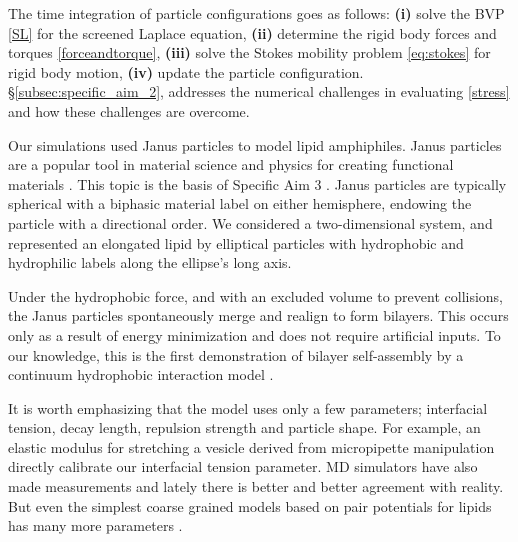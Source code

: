 The time integration of particle configurations goes as follows: 
\textbf{(i)} solve the BVP \eqref{SL} for the screened Laplace equation, 
\textbf{(ii)} determine the rigid body forces and torques \eqref{forceandtorque}, 
\textbf{(iii)} solve the Stokes mobility problem \eqref{eq:stokes} for rigid body motion,
\textbf{(iv)} update the particle configuration. 
\S \ref{subsec:specific_aim_2}, addresses the numerical challenges in 
evaluating \eqref{stress} and how these challenges are overcome. 



Our simulations used Janus particles to model
lipid amphiphiles. Janus particles are a popular tool in material science and physics
for creating functional materials \cite{Lee2014, Lee2013}. 
This topic is the basis of Specific Aim 3 . Janus particles are typically
spherical with a biphasic material label on either hemisphere,  endowing the particle
with a directional order. We considered a two-dimensional system, and represented an 
elongated lipid by elliptical particles with hydrophobic and hydrophilic labels along the ellipse's long axis. 

Under the hydrophobic force, and with an excluded volume to prevent collisions, the 
Janus particles spontaneously merge and realign to form bilayers. This occurs only as a result
of energy minimization and does not require artificial inputs. To our knowledge, this is the first demonstration 
of bilayer self-assembly by a continuum hydrophobic interaction model \cite{Noguchi2001,Farago2003,Brannigan2006,Brooks2009,Wang2013}.  

It is worth emphasizing that the model uses only a few parameters; interfacial tension, decay length, repulsion strength and particle
shape. For example, an elastic modulus for stretching a vesicle derived from micropipette manipulation 
directly calibrate our interfacial tension parameter. 
MD simulators have also made measurements and lately there is better and better agreement with reality. 
But even the simplest coarse grained models based on pair potentials for lipids has many more parameters \cite{Varilly2011,Wang2013} . 

